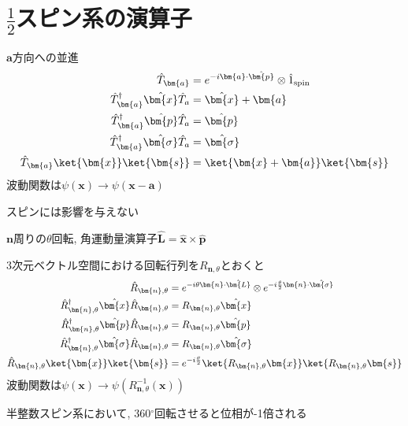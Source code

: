 \section{$\frac{1}{2}$スピン系の演算子}
\begin{deftcolorbox}[title = 並進演算子$\hat{T}_{\bm{a}}$]
$\bm{a}$方向への並進
\begin{align*}
    \hat{T}_{\bm{a}} &= e^{-i \bm{a} \cdot \hat{\bm{p}}} \otimes \hat{1}_{\mathrm{spin}}\\
    \hat{T}_{\bm{a}}^{\dagger} \hat{\bm{x}} \hat{T}_{a} & = \hat{\bm{x}} + \bm{a}\\
    \hat{T}_{\bm{a}}^{\dagger} \hat{\bm{p}} \hat{T}_{a} & = \hat{\bm{p}}\\
    \hat{T}_{\bm{a}}^{\dagger} \hat{\bm{\sigma}} \hat{T}_{a} & = \hat{\bm{\sigma}}\\
    \hat{T}_{\bm{a}} \ket{\bm{x}}\ket{\bm{s}} &= \ket{\bm{x} + \bm{a}}\ket{\bm{s}}
\end{align*}
波動関数は$\psi(\bm{x}) \rightarrow \psi(\bm{x} - \bm{a})$

スピンには影響を与えない
\end{deftcolorbox}

\begin{deftcolorbox}[title = 回転演算子$\hat{R}_{\bm{n},\theta}$]
$\bm{n}$周りの$\theta$回転, 角運動量演算子$\hat{\bm{L}} = \hat{\bm{x}} \times \hat{\bm{p}}$

3次元ベクトル空間における回転行列を$R_{\bm{n},\theta}$とおくと
\begin{align*}
    \hat{R}_{\bm{n},\theta} &= e^{-i \theta \bm{n}\cdot \hat{\bm{L}}} \otimes e^{-i\frac{\theta}{2}\bm{n}\cdot \hat{\bm{\sigma}}}\\
    \hat{R}_{\bm{n},\theta}^{\dagger} \hat{\bm{x}} \hat{R}_{\bm{n},\theta} &= R_{\bm{n},\theta}\hat{\bm{x}}\\
    \hat{R}_{\bm{n},\theta}^{\dagger} \hat{\bm{p}} \hat{R}_{\bm{n},\theta} &= R_{\bm{n},\theta}\hat{\bm{p}}\\
    \hat{R}_{\bm{n},\theta}^{\dagger} \hat{\bm{\sigma}} \hat{R}_{\bm{n},\theta} &= R_{\bm{n},\theta}\hat{\bm{\sigma}}\\
    \hat{R}_{\bm{n},\theta}\ket{\bm{x}}\ket{\bm{s}} &= e^{-i\frac{\theta}{2}} \ket{R_{\bm{n},\theta}\bm{x}} \ket{R_{\bm{n},\theta}\bm{s}}
\end{align*}
波動関数は$\psi(\bm{x}) \rightarrow \psi(R^{-1}_{\bm{n},\theta}(\bm{x}))$

半整数スピン系において, 360$^\circ$回転させると位相が-1倍される
\end{deftcolorbox}

